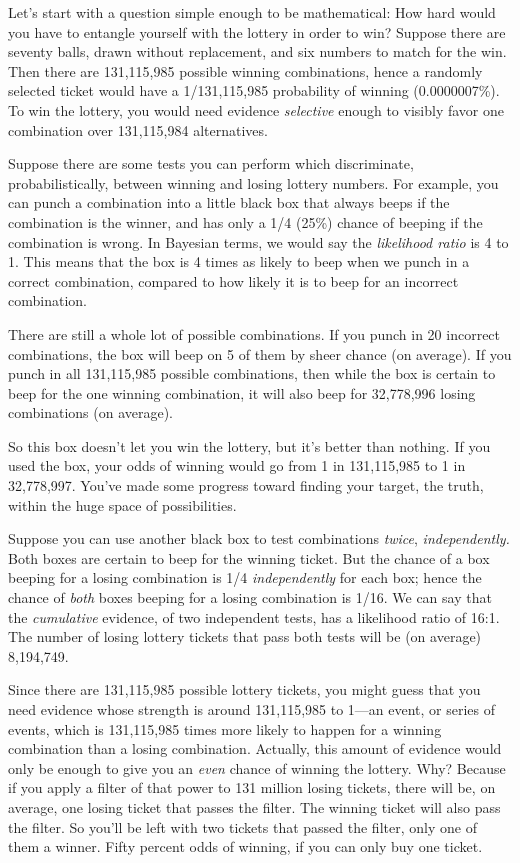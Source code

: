 {
 Let's start with a question simple enough to be
mathematical: How hard would you have to entangle yourself with the
lottery in order to win? Suppose there are seventy balls, drawn without
replacement, and six numbers to match for the win. Then there are
131,115,985 possible winning combinations, hence a randomly selected
ticket would have a 1/131,115,985 probability of winning (0.0000007\%).
To win the lottery, you would need evidence \textit{selective} enough
to visibly favor one combination over 131,115,984 alternatives.}

{
 Suppose there are some tests you can perform which discriminate,
probabilistically, between winning and losing lottery numbers. For
example, you can punch a combination into a little black box that
always beeps if the combination is the winner, and has only a 1/4
(25\%) chance of beeping if the combination is wrong. In Bayesian
terms, we would say the \textit{likelihood ratio} is 4 to 1. This means
that the box is 4 times as likely to beep when we punch in a correct
combination, compared to how likely it is to beep for an incorrect
combination.}

{
 There are still a whole lot of possible combinations. If you punch
in 20 incorrect combinations, the box will beep on 5 of them by sheer
chance (on average). If you punch in all 131,115,985 possible
combinations, then while the box is certain to beep for the one winning
combination, it will also beep for 32,778,996 losing combinations (on
average).}

{
 So this box doesn't let you win the lottery, but
it's better than nothing. If you used the box, your
odds of winning would go from 1 in 131,115,985 to 1 in 32,778,997.
You've made some progress toward finding your target,
the truth, within the huge space of possibilities.}

{
 Suppose you can use another black box to test combinations
\textit{twice}, \textit{independently.} Both boxes are certain to beep
for the winning ticket. But the chance of a box beeping for a losing
combination is 1/4 \textit{independently} for each box; hence the
chance of \textit{both} boxes beeping for a losing combination is 1/16.
We can say that the \textit{cumulative} evidence, of two independent
tests, has a likelihood ratio of 16:1. The number of losing lottery
tickets that pass both tests will be (on average) 8,194,749.}

{
 Since there are 131,115,985 possible lottery tickets, you might
guess that you need evidence whose strength is around 131,115,985 to
1---an event, or series of events, which is 131,115,985 times more
likely to happen for a winning combination than a losing combination.
Actually, this amount of evidence would only be enough to give you an
\textit{even} chance of winning the lottery. Why? Because if you apply
a filter of that power to 131 million losing tickets, there will be, on
average, one losing ticket that passes the filter. The winning ticket
will also pass the filter. So you'll be left with two
tickets that passed the filter, only one of them a winner. Fifty
percent odds of winning, if you can only buy one ticket.}

